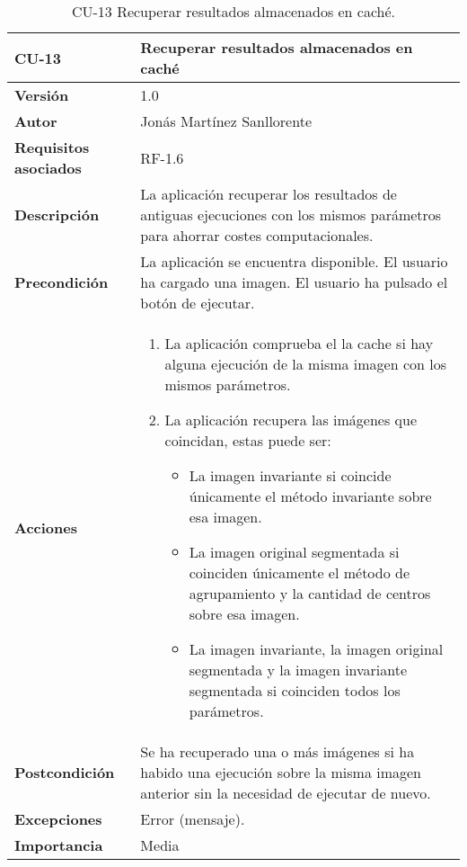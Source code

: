 \begin{table}[p]
	\centering
	\begin{tabularx}{\linewidth}{ p{} p{} }
		\toprule
		\textbf{CU-13}    & \textbf{Recuperar resultados almacenados en caché}\\
		\toprule
		\textbf{Versión}              & 1.0    \\
		\textbf{Autor}                & Jonás Martínez Sanllorente \\
		\textbf{Requisitos asociados} & RF-1.6 \\
		\textbf{Descripción}          & La aplicación recuperar los resultados de antiguas ejecuciones con los mismos parámetros para ahorrar costes computacionales. \\
		\textbf{Precondición}         & La aplicación se encuentra disponible.\newline
                                        El usuario ha cargado una imagen.\newline
                                        El usuario ha pulsado el botón de ejecutar.\\
		\textbf{Acciones}             &
		\begin{enumerate}
			\def\labelenumi{\arabic{enumi}.}
			\tightlist
			\item La aplicación comprueba el la cache si hay alguna ejecución de la misma imagen con los mismos parámetros.
            \item La aplicación recupera las imágenes que coincidan, estas puede ser:
            \begin{itemize}
                \item La imagen invariante si coincide únicamente el método invariante sobre esa imagen.
                \item La imagen original segmentada si coinciden únicamente el método de agrupamiento y la cantidad de centros sobre esa imagen.
                \item La imagen invariante, la imagen original segmentada y la imagen invariante segmentada si coinciden todos los parámetros.
            \end{itemize}
		\end{enumerate}\\
		\textbf{Postcondición}        & Se ha recuperado una o más imágenes si ha habido una ejecución sobre la misma imagen anterior sin la necesidad de ejecutar de nuevo. \\
		\textbf{Excepciones}          & Error (mensaje).\\
		\textbf{Importancia}          & Media \\
		\bottomrule
	\end{tabularx}
	\caption{CU-13 Recuperar resultados almacenados en caché.}
\end{table}


